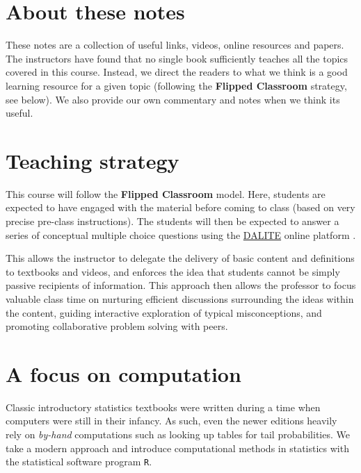 \documentclass[]{book}
\theoremstyle{definition}
\theoremstyle{definition}
\theoremstyle{definition}
\theoremstyle{remark}
\begin{document}
\section*{About these notes}\label{about-these-notes}

These notes are a collection of useful links, videos, online resources
and papers. The instructors have found that no single book sufficiently
teaches all the topics covered in this course. Instead, we direct the
readers to what we think is a good learning resource for a given topic
(following the \textbf{Flipped Classroom} strategy, see below). We also
provide our own commentary and notes when we think its useful.

\section*{Teaching strategy}\label{teaching-strategy}

This course will follow the \textbf{Flipped Classroom} model. Here,
students are expected to have engaged with the material before coming to
class (based on very precise pre-class instructions). The students will
then be expected to answer a series of conceptual multiple choice
questions using the
\href{https://mydalite.org/en/live/signup/form/NTc4}{DALITE} online
platform \citep{bhatnagar2016dalite}.

This allows the instructor to delegate the delivery of basic content and
definitions to textbooks and videos, and enforces the idea that students
cannot be simply passive recipients of information. This approach then
allows the professor to focus valuable class time on nurturing efficient
discussions surrounding the ideas within the content, guiding
interactive exploration of typical misconceptions, and promoting
collaborative problem solving with peers.

\section*{A focus on computation}\label{a-focus-on-computation}

Classic introductory statistics textbooks were written during a time
when computers were still in their infancy. As such, even the newer
editions heavily rely on \emph{by-hand} computations such as looking up
tables for tail probabilities. We take a modern approach and introduce
computational methods in statistics with the statistical software
program \texttt{R}.
\end{document}
